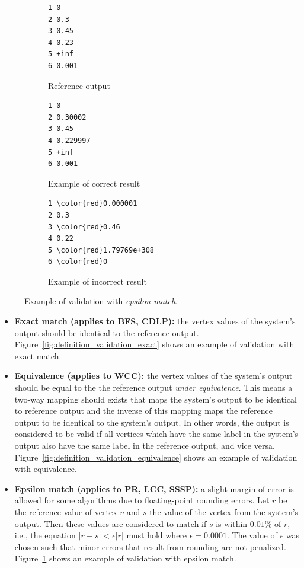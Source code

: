 \begin{figure}[h]
\centering
\begin{subfigure}{0.3\textwidth}
\begin{Verbatim}[frame=single]
1 0
2 0.3
3 0.45
4 0.23
5 +inf
6 0.001
\end{Verbatim}
\caption{Reference output}
\end{subfigure}
\begin{subfigure}{0.3\textwidth}
\begin{Verbatim}[frame=single]
1 0
2 0.30002
3 0.45
4 0.229997
5 +inf
6 0.001
\end{Verbatim}
\caption{Example of correct result}
\end{subfigure}
\begin{subfigure}{0.3\textwidth}
\begin{Verbatim}[frame=single,commandchars=\\\{\}]
1 \color{red}0.000001
2 0.3
3 \color{red}0.46
4 0.22
5 \color{red}1.79769e+308
6 \color{red}0
\end{Verbatim}
\caption{Example of incorrect result}
\end{subfigure}
\caption{Example of validation with \emph{epsilon match}.}
\label{fig:definition_validation_epsilon}
\end{figure}


\begin{itemize}

\item \textbf{Exact match (applies to BFS, CDLP):} the vertex values of the system's output should be identical to the reference output. Figure~\ref{fig:definition_validation_exact} shows an example of validation with exact match.

\item \textbf{Equivalence (applies to WCC):} the vertex values of the system's output should be equal to the the reference output \emph{under equivalence}. This means a two-way mapping should exists that maps the system's output to be identical to reference output and the inverse of this mapping maps the reference output to be identical to the system's output. In other words, the output is considered to be valid if all vertices which have the same label in the system's output also have the same label in the reference output, and vice versa. Figure~\ref{fig:definition_validation_equivalence} shows an example of validation with equivalence.

\item \textbf{Epsilon match (applies to PR, LCC, SSSP):} a slight margin of error is allowed for some algorithms due to floating-point rounding errors. Let $r$ be the reference value of vertex $v$ and $s$ the value of the vertex from the system's output. Then these values are considered to match if $s$ is within $0.01\%$ of $r$, i.e., the equation $|r-s| < \epsilon |r|$ must hold where $\epsilon=0.0001$. The value of $\epsilon$ was chosen such that minor errors that result from rounding are not penalized. Figure~\ref{fig:definition_validation_epsilon} shows an example of validation with epsilon match.
\end{itemize}

